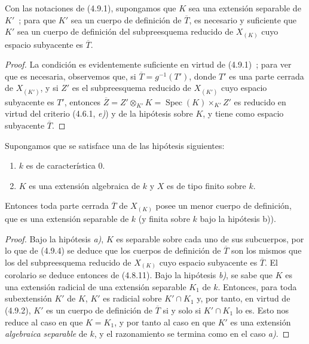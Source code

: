 \begin{proposition}[4.9.4]
\label{IV.2.4.9.4-fr}
Con las notaciones de \textup{(4.9.1)}, supongamos que $K$ sea una extensión separable
de $K'$~; para que $K'$ sea un cuerpo de definición de $\overline T$, es
necesario y suficiente que $K'$ sea un cuerpo de definición del subpreesquema
reducido de $X_{(K)}$ cuyo espacio subyacente es $\overline T$.
\end{proposition}

\begin{proof}
La condición es evidentemente suficiente en virtud de (4.9.1)~; para ver que
es necesaria, observemos que, si $\overline T=g^{-1}(T')$, donde $T'$ es una
parte cerrada de $X_{(K')}$, y si $Z'$ es el subpreesquema reducido de
$X_{(K')}$ cuyo espacio subyacente es $T'$, entonces
$\overline Z=Z'\otimes_{K'}K=\operatorname{Spec}(K)\times_{K'}Z'$ es reducido
en virtud del criterio (4.6.1, \emph{e)}) y de la hipótesis sobre $K$, y tiene como
espacio subyacente $\overline T$.
\end{proof}

\begin{corollary}[4.9.5]
\label{IV.2.4.9.5-fr}
Supongamos que se satisface una de las hipótesis siguientes:
\begin{enumerate}
\item[\textup{a)}] $k$ es de característica $0$.
\item[\textup{b)}] $K$ es una extensión algebraica de $k$ y $X$ es de tipo finito sobre
$k$.
\end{enumerate}
Entonces toda parte cerrada $\overline T$ de $X_{(K)}$ posee un menor cuerpo
de definición, que es una extensión separable de $k$ (y finita sobre
$k$ bajo la hipótesis \textup{b))}.
\end{corollary}

\begin{proof}
Bajo la hipótesis \emph{a)}, $K$ es separable sobre cada uno de sus subcuerpos, por lo
que de (4.9.4) se deduce que los cuerpos de definición de $\overline T$ son los
mismos que los del subpreesquema reducido de $X_{(K)}$ cuyo espacio subyacente
es $\overline T$. El corolario se deduce entonces de (4.8.11). Bajo la
hipótesis \emph{b)}, se sabe que $K$ es una extensión radicial de una extensión
separable $K_1$ de $k$. Entonces, para toda subextensión $K'$ de $K$, $K'$ es
radicial sobre $K'\cap K_1$ y, por tanto, en virtud de (4.9.2), $K'$ es un
cuerpo de definición de $\overline T$ si y solo si $K'\cap K_1$ lo es. Esto
nos reduce al caso en que $K=K_1$, y por tanto al caso en que $K'$ es una
extensión \emph{algebraica separable} de $k$, y el razonamiento se termina como en el
caso \emph{a)}.
\end{proof}

